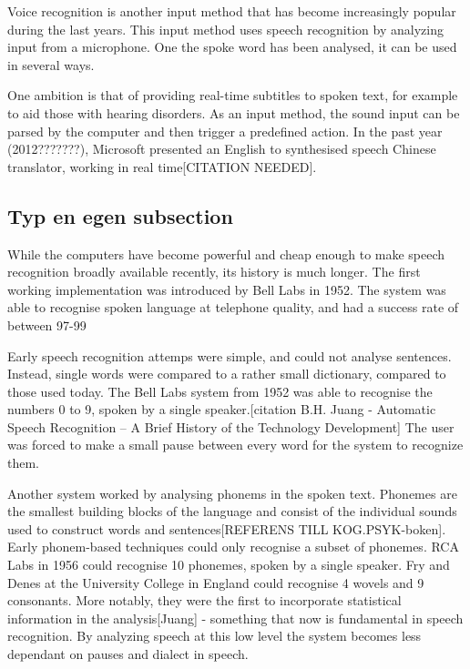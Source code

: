 Voice recognition is another input method that has become increasingly popular during the last years. This input method uses speech recognition by analyzing input from a microphone. One the spoke word has been analysed, it can be used in several ways.

One ambition is that of providing real-time subtitles to spoken text, for example to aid those with hearing disorders. As an input method, the sound input can be parsed by the computer and then trigger a predefined action. In the past year (2012???????), Microsoft presented an English to synthesised speech Chinese translator, working in real time[CITATION NEEDED]. 

\subsection{Typ en egen subsection}

While the computers have become powerful and cheap enough to make speech recognition broadly available recently, its history is much longer. The first working implementation was introduced by Bell Labs in 1952. The system was able to recognise spoken language at telephone quality, and had a success rate of between 97-99%

Early speech recognition attemps were simple, and could not analyse sentences. Instead, single words were compared to a rather small dictionary, compared to those used today. The Bell Labs system from 1952 was able to recognise the numbers 0 to 9, spoken by a single speaker.[citation B.H. Juang - Automatic Speech Recognition – A Brief History of the Technology Development] The user was forced to make a small pause between every word for the system to recognize them. 

Another system worked by analysing phonems in the spoken text. Phonemes are the smallest building blocks of the language and consist of the individual sounds used to construct words and sentences[REFERENS TILL KOG.PSYK-boken]. Early phonem-based techniques could only recognise a subset of phonemes. RCA Labs in 1956 could recognise 10 phonemes, spoken by a single speaker. Fry and Denes at the University College in England could recognise 4 wovels and 9 consonants. More notably, they were the first to incorporate statistical information in the analysis[Juang] - something that now is fundamental in speech recognition. By analyzing speech at this low level the system becomes less dependant on pauses and dialect in speech.

